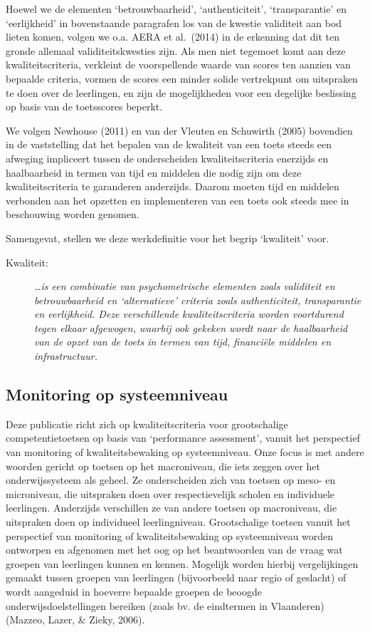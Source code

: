 \documentclass[
  letterpaper,
]{report}
\begin{document}
Hoewel we de elementen `betrouwbaarheid', `authenticiteit',
`transparantie' en `eerlijkheid' in bovenstaande paragrafen los van de
kwestie validiteit aan bod lieten komen, volgen we o.a. AERA et
al.~(2014) in de erkenning dat dit ten gronde allemaal
validiteitskwesties zijn. Als men niet tegemoet komt aan deze
kwaliteitscriteria, verkleint de voorspellende waarde van scores ten
aanzien van bepaalde criteria, vormen de scores een minder solide
vertrekpunt om uitspraken te doen over de leerlingen, en zijn de
mogelijkheden voor een degelijke beslissing op basis van de toetsscores
beperkt.

We volgen Newhouse (2011) en van der Vleuten en Schuwirth (2005)
bovendien in de vaststelling dat het bepalen van de kwaliteit van een
toets steeds een afweging impliceert tussen de onderscheiden
kwaliteitscriteria enerzijds en haalbaarheid in termen van tijd en
middelen die nodig zijn om deze kwaliteitscriteria te garanderen
anderzijds. Daarom moeten tijd en middelen verbonden aan het opzetten en
implementeren van een toets ook steeds mee in beschouwing worden
genomen.

Samengevat, stellen we deze werkdefinitie voor het begrip `kwaliteit'
voor.

\begin{description}
\item[Kwaliteit:]
\emph{\ldots is een combinatie van psychometrische elementen zoals
validiteit en betrouwbaarheid en `alternatieve' criteria zoals
authenticiteit, transparantie en eerlijkheid. Deze verschillende
kwaliteitscriteria worden voortdurend tegen elkaar afgewogen, waarbij
ook gekeken wordt naar de haalbaarheid van de opzet van de toets in
termen van tijd, financiële middelen en infrastructuur.}
\end{description}

\hypertarget{monitoring-op-systeemniveau}{%
\subsection{Monitoring op
systeemniveau}\label{monitoring-op-systeemniveau}}

Deze publicatie richt zich op kwaliteitscriteria voor grootschalige
competentietoetsen op basis van `performance assessment', vanuit het
perspectief van monitoring of kwaliteitsbewaking op systeemniveau. Onze
focus is met andere woorden gericht op toetsen op het macroniveau, die
iets zeggen over het onderwijssysteem als geheel. Ze onderscheiden zich
van toetsen op meso- en microniveau, die uitspraken doen over
respectievelijk scholen en individuele leerlingen. Anderzijds
verschillen ze van andere toetsen op macroniveau, die uitspraken doen op
individueel leerlingniveau. Grootschalige toetsen vanuit het perspectief
van monitoring of kwaliteitsbewaking op systeemniveau worden ontworpen
en afgenomen met het oog op het beantwoorden van de vraag wat groepen
van leerlingen kunnen en kennen. Mogelijk worden hierbij vergelijkingen
gemaakt tussen groepen van leerlingen (bijvoorbeeld naar regio of
geslacht) of wordt aangeduid in hoeverre bepaalde groepen de beoogde
onderwijsdoelstellingen bereiken (zoals bv. de eindtermen in Vlaanderen)
(Mazzeo, Lazer, \& Zieky, 2006).
\end{document}
